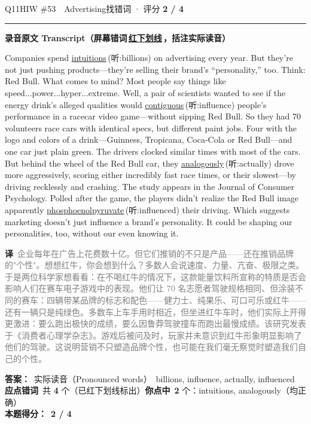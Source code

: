 \documentclass[11pt]{article}
\newcommand{\ptesub}[1]{%
  \par\needspace{2\baselineskip}\smallskip
  {\color{cAccent}\rule[-0.2ex]{3pt}{1.05em}}\hspace{6pt}%
  {\bfseries\color{cHead}#1}\par\nopagebreak\smallskip}
\newcommand{\zh}[1]{{\footnotesize\textcolor{cNote}{\textbf{译}}\ \textcolor{gray}{#1}}}
\newcommand{\hiw}[2]{{\color{cWrong}\uline{#1}}\,{\footnotesize\color{cFix}(听:#2)}} %
\begin{document}
\begin{qblock}{Q11\quad HIW \#53\ \ Advertising}{找错词 · 评分 \textcolor{cAccent}{\bfseries 2 / 4}}
\ptesub{录音原文 Transcript（屏幕错词\,{\color{cWrong}\uline{红下划线}}\,，括注实际读音）}
\begin{promptbox}
Companies spend \hiw{intuitions}{billions} on advertising every year. But they're not just pushing products---they're selling their brand's ``personality,'' too. Think: Red Bull. What comes to mind? Most people say things like speed...power...hyper...extreme. Well, a pair of scientists wanted to see if the energy drink's alleged qualities would \hiw{contiguous}{influence} people's performance in a racecar video game---without sipping Red Bull. So they had 70 volunteers race cars with identical specs, but different paint jobs. Four with the logo and colors of a drink---Guinness, Tropicana, Coca-Cola or Red Bull---and one car just plain green. The drivers clocked similar times with most of the cars. But behind the wheel of the Red Bull car, they \hiw{analogously}{actually} drove more aggressively, scoring either incredibly fast race times, or their slowest---by driving recklessly and crashing. The study appears in the Journal of Consumer Psychology. Polled after the game, the players didn't realize the Red Bull image apparently \hiw{phosphoenolpyruvate}{influenced} their driving. Which suggests marketing doesn't just influence a brand's personality. It could be shaping our personalities, too, without our even knowing it.
\end{promptbox}
\zh{企业每年在广告上花费数十亿。但它们推销的不只是产品——还在推销品牌的"个性"。想想红牛，你会想到什么？多数人会说速度、力量、亢奋、极限之类。于是两位科学家想看看：在不喝红牛的情况下，这款能量饮料所宣称的特质是否会影响人们在赛车电子游戏中的表现。他们让 70 名志愿者驾驶规格相同、但涂装不同的赛车：四辆带某品牌的标志和配色——健力士、纯果乐、可口可乐或红牛——还有一辆只是纯绿色。多数车上车手用时相近，但坐进红牛车时，他们实际上开得更激进：要么跑出极快的成绩，要么因鲁莽驾驶撞车而跑出最慢成绩。该研究发表于《消费者心理学杂志》。游戏后被问及时，玩家并未意识到红牛形象明显影响了他们的驾驶。这说明营销不只塑造品牌个性，也可能在我们毫无察觉时塑造我们自己的个性。}
\par\smallskip
\textbf{答案：}\ 实际读音（Pronounced words）\ {\color{cFix}billions, influence, actually, influenced}\\
\textbf{应点错词}\ 共 \textbf{4} 个（已红下划线标出）\qquad\textbf{你点中}\ \textbf{2} 个：intuitions, analogously（均正确）\\[2pt]\textbf{本题得分：}\ {\color{cAccent}\bfseries 2 / 4}
\end{qblock}
\end{document}
